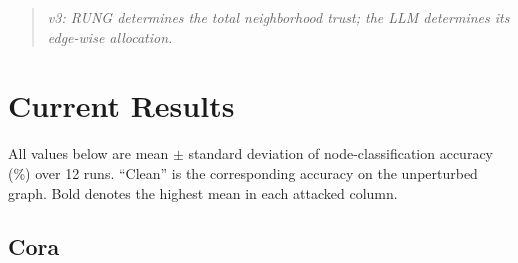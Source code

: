 \documentclass{article}
\begin{document}
\begin{quote}
\textit{v3: RUNG determines the total neighborhood trust; the LLM determines
its edge-wise allocation.}
\end{quote}

\section{Current Results}

All values below are mean $\pm$ standard deviation of node-classification
accuracy (\%) over 12 runs. ``Clean'' is the corresponding accuracy on the
unperturbed graph. Bold denotes the highest mean in each attacked column.

\subsection{Cora}
\end{document}
